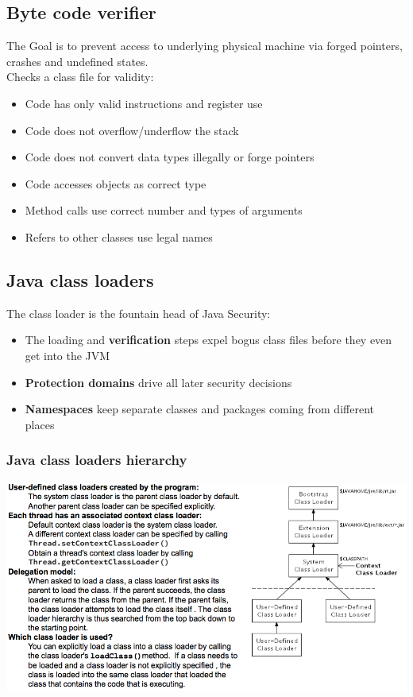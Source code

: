 \documentclass[10pt]{article}
\begin{document}
\subsection{Byte code verifier}
The Goal is to prevent access to underlying physical machine via forged pointers, crashes and undefined states. \\
Checks a class file for validity:
\begin{itemize}
	\item Code has only valid instructions and register use
	\item Code does not overflow/underflow the stack
	\item Code does not convert data types illegally or forge pointers
	\item Code accesses objects as correct type
	\item Method calls use correct number and types of arguments
	\item Refers to other classes use legal names
\end{itemize}

\subsection{Java class loaders}
The class loader is the fountain head of Java Security:
\begin{itemize}
	\item The loading and \textbf{verification} steps expel bogus class files before they even get into the JVM
	\item \textbf{Protection domains} drive all later security decisions
	\item \textbf{Namespaces} keep separate classes and packages coming from different places
\end{itemize}

\subsubsection{Java class loaders hierarchy}
\begin{center}
	\includegraphics[scale=0.5]{class_loaders-hierarchy.png}
\end{center}
\end{document}
